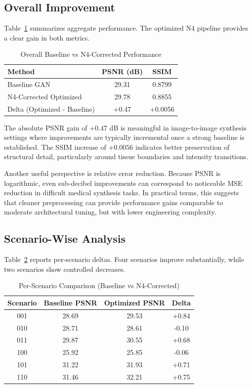 \documentclass[conference]{IEEEtran}
\begin{document}
\subsection{Overall Improvement}
Table~\ref{tab:overall} summarizes aggregate performance. The optimized N4 pipeline provides a clear gain in both metrics.

\begin{table}[H]
\centering
\caption{Overall Baseline vs N4-Corrected Performance}
\label{tab:overall}
\begin{tabular}{lcc}
\toprule
Method & PSNR (dB) & SSIM \\
\midrule
Baseline GAN & 29.31 & 0.8799 \\
N4-Corrected Optimized & 29.78 & 0.8855 \\
\midrule
Delta (Optimized - Baseline) & +0.47 & +0.0056 \\
\bottomrule
\end{tabular}
\end{table}

The absolute PSNR gain of $+0.47$ dB is meaningful in image-to-image synthesis settings where improvements are typically incremental once a strong baseline is established. The SSIM increase of $+0.0056$ indicates better preservation of structural detail, particularly around tissue boundaries and intensity transitions.

Another useful perspective is relative error reduction. Because PSNR is logarithmic, even sub-decibel improvements can correspond to noticeable MSE reduction in difficult medical synthesis tasks. In practical terms, this suggests that cleaner preprocessing can provide performance gains comparable to moderate architectural tuning, but with lower engineering complexity.

\subsection{Scenario-Wise Analysis}
Table~\ref{tab:scenario} reports per-scenario deltas. Four scenarios improve substantially, while two scenarios show controlled decreases.

\begin{table}[H]
\centering
\caption{Per-Scenario Comparison (Baseline vs N4-Corrected)}
\label{tab:scenario}
\begin{tabular}{cccc}
\toprule
Scenario & Baseline PSNR & Optimized PSNR & Delta \\
\midrule
001 & 28.69 & 29.53 & +0.84 \\
010 & 28.71 & 28.61 & -0.10 \\
011 & 29.87 & 30.55 & +0.68 \\
100 & 25.92 & 25.85 & -0.06 \\
101 & 31.22 & 31.93 & +0.71 \\
110 & 31.46 & 32.21 & +0.75 \\
\bottomrule
\end{tabular}
\end{table}
\end{document}
